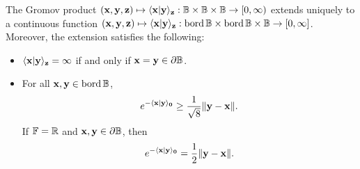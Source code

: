 \begin{lemma}
\label{lemmagromovextension}
The Gromov product $(\xx,\yy,\zz)\mapsto \lb \xx|\yy\rb_\zz:\B\times\B\times\B\to\Rplus$ extends uniquely to a continuous function $(\xx,\yy,\zz)\mapsto \lb \xx|\yy\rb_\zz:\bord\B\times\bord\B\times\B\to[0,\infty]$. Moreover, the extension satisfies the following:
\begin{itemize}
\item[(i)] $\langle\mathbf x|\mathbf y\rangle_{\mathbf z} = \infty$ if and only if $\xx = \yy\in\del\B$.
\item[(ii)] For all $\xx,\yy\in\bord\B$,
\begin{equation}
\label{euclideanball1}
e^{-\langle\mathbf x|\mathbf y\rangle_\mathbf 0} \geq \frac{1}{\sqrt 8}\|\mathbf y - \mathbf x\|.
\end{equation}
If $\F = \R$ and $\xx,\yy\in\del\B$, then
\begin{equation}
\label{euclideanball2}
e^{-\langle\mathbf x|\mathbf y\rangle_\mathbf 0} = \frac12\|\mathbf y - \mathbf x\|.
\end{equation}
\end{itemize}
\end{lemma}
